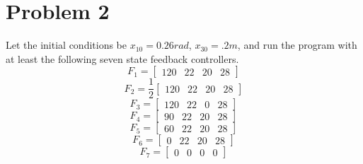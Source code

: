 \documentclass{article}
\begin{document}
\section*{Problem 2}
Let the initial conditions be $x_{10} = 0.26rad$, $x_{30} = .2m$, and run the program with at least the following seven state feedback controllers.
$$ F_1 = \begin{bmatrix} 120 & 22 & 20 & 28 \end{bmatrix} $$
$$ F_2 = \frac{1}{2}\begin{bmatrix} 120 & 22 & 20 & 28 \end{bmatrix} $$
$$ F_3 = \begin{bmatrix} 120 & 22 & 0 & 28 \end{bmatrix} $$
$$ F_4 = \begin{bmatrix} 90 & 22 & 20 & 28 \end{bmatrix} $$
$$ F_5 = \begin{bmatrix} 60 & 22 & 20 & 28 \end{bmatrix} $$
$$ F_6 = \begin{bmatrix} 0 & 22 & 20 & 28 \end{bmatrix} $$
$$ F_7 = \begin{bmatrix} 0 & 0 & 0 & 0 \end{bmatrix} $$
\newline
\newline
\end{document}
